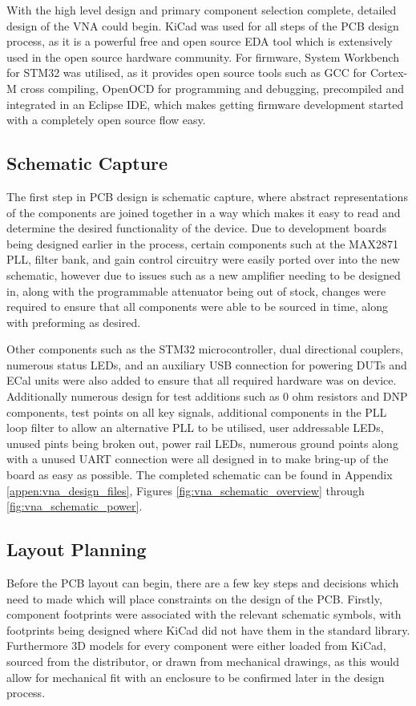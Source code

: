 With the high level design and primary component selection complete, detailed design of the VNA could begin. KiCad was used for all steps of the PCB design process, as it is a powerful free and open source EDA tool which is extensively used in the open source hardware community. For firmware, System Workbench for STM32 was utilised, as it provides open source tools such as GCC for Cortex-M cross compiling, OpenOCD for programming and debugging, precompiled and integrated in an Eclipse IDE, which makes getting firmware development started with a completely open source flow easy.

\subsection{Schematic Capture}
The first step in PCB design is schematic capture, where abstract representations of the components are joined together in a way which makes it easy to read and determine the desired functionality of the device. Due to development boards being designed earlier in the process, certain components such at the MAX2871 PLL, filter bank, and gain control circuitry were easily ported over into the new schematic, however due to issues such as a new amplifier needing to be designed in, along with the programmable attenuator being out of stock, changes were required to ensure that all components were able to be sourced in time, along with preforming as desired.

Other components such as the STM32 microcontroller, dual directional couplers, numerous status LEDs, and an auxiliary USB connection for powering DUTs and ECal units were also added to ensure that all required hardware was on device. Additionally numerous design for test additions such as 0 ohm resistors and DNP components, test points on all key signals, additional components in the PLL loop filter to allow an alternative PLL to be utilised, user addressable LEDs, unused pints being broken out, power rail LEDs, numerous ground points along with a unused UART connection were all designed in to make bring-up of the board as easy as possible. The completed schematic can be found in Appendix \ref{appen:vna_design_files}, Figures \ref{fig:vna_schematic_overview} through \ref{fig:vna_schematic_power}.

\subsection{Layout Planning}
Before the PCB layout can begin, there are a few key steps and decisions which need to made which will place constraints on the design of the PCB. Firstly, component footprints were associated with the relevant schematic symbols, with footprints being designed where KiCad did not have them in the standard library. Furthermore 3D models for every component were either loaded from KiCad, sourced from the distributor, or drawn from mechanical drawings, as this would allow for mechanical fit with an enclosure to be confirmed later in the design process. 

